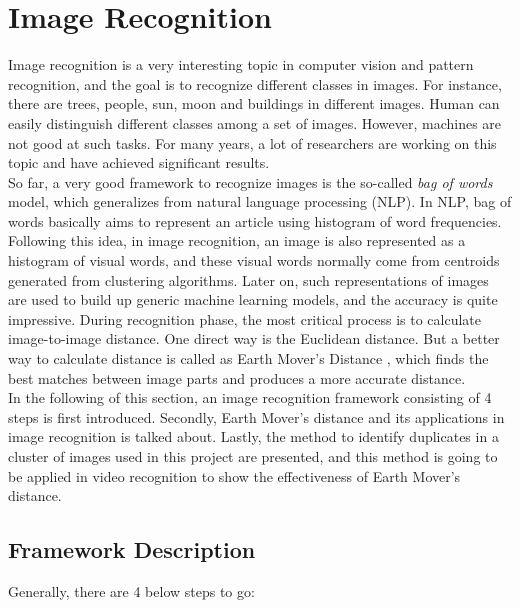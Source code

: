 \section {Image Recognition}
Image recognition is a very interesting topic in computer vision and pattern recognition, and the goal is to recognize different classes in images. For instance, there are trees, people, sun, moon and buildings in different images. Human can easily distinguish different classes among a set of images. However, machines are not good at such tasks. For many years, a lot of researchers are working on this topic and have achieved significant results.\\

\noindent So far, a very good framework to recognize images is the so-called {\em bag of words} model, which generalizes from natural language processing (NLP). In NLP, bag of words basically aims to represent an article using histogram of word frequencies. Following this idea, in image recognition, an image is also represented as a histogram of visual words, and these visual words normally come from centroids generated from clustering algorithms. Later on, such representations of images are used to build up generic machine learning models, and the accuracy is quite impressive. During recognition phase, the most critical process is to calculate image-to-image distance. One direct way is the Euclidean distance. But a better way to calculate distance is called as Earth Mover's Distance \cite{rubner2000earth}, which finds the best matches between image parts and produces a more accurate distance. \\

\noindent In the following of this section, an image recognition framework consisting of 4 steps is first introduced. Secondly, Earth Mover's distance and its applications in image recognition is talked about. Lastly, the method to identify duplicates in a cluster of images used in this project are presented, and this method is going to be applied in video recognition to show the effectiveness of Earth Mover's distance.

\subsection{Framework Description}

Generally, there are 4 below steps to go:

